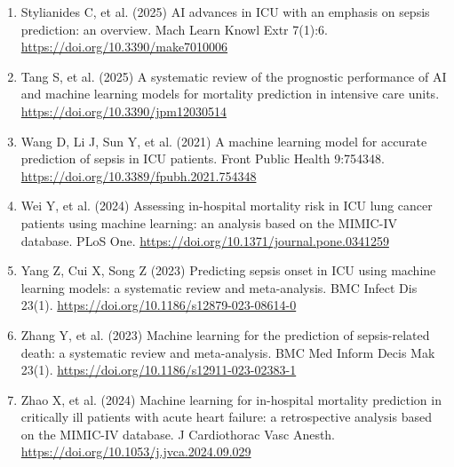 \documentclass[12pt,a4paper]{report}
\begin{document}
\begin{enumerate}
  \item Stylianides C, et al. (2025) AI advances in ICU with an emphasis on sepsis prediction: an overview. Mach Learn Knowl Extr 7(1):6. \url{https://doi.org/10.3390/make7010006}
  \item Tang S, et al. (2025) A systematic review of the prognostic performance of AI and machine learning models for mortality prediction in intensive care units. \url{https://doi.org/10.3390/jpm12030514}
  \item Wang D, Li J, Sun Y, et al. (2021) A machine learning model for accurate prediction of sepsis in ICU patients. Front Public Health 9:754348. \url{https://doi.org/10.3389/fpubh.2021.754348}
  \item Wei Y, et al. (2024) Assessing in-hospital mortality risk in ICU lung cancer patients using machine learning: an analysis based on the MIMIC-IV database. PLoS One. \url{https://doi.org/10.1371/journal.pone.0341259}
  \item Yang Z, Cui X, Song Z (2023) Predicting sepsis onset in ICU using machine learning models: a systematic review and meta-analysis. BMC Infect Dis 23(1). \url{https://doi.org/10.1186/s12879-023-08614-0}
  \item Zhang Y, et al. (2023) Machine learning for the prediction of sepsis-related death: a systematic review and meta-analysis. BMC Med Inform Decis Mak 23(1). \url{https://doi.org/10.1186/s12911-023-02383-1}
  \item Zhao X, et al. (2024) Machine learning for in-hospital mortality prediction in critically ill patients with acute heart failure: a retrospective analysis based on the MIMIC-IV database. J Cardiothorac Vasc Anesth. \url{https://doi.org/10.1053/j.jvca.2024.09.029}
\end{enumerate}
\endgroup
\end{document}
